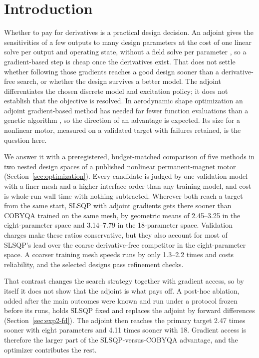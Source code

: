 \documentclass{anvil-paper}
\begin{document}
\section{Introduction}
Whether to pay for derivatives is a practical design decision. An adjoint
gives the sensitivities of a few outputs to many design parameters at the
cost of one linear solve per output and operating state, without a field
solve per parameter \citep{scotzniovsky2025}, so a gradient-based step is
cheap once the derivatives exist. That does not settle whether following those
gradients reaches a good design sooner than a derivative-free search, or
whether the design survives a better model. The adjoint differentiates the
chosen discrete model and excitation policy; it does not establish that the
objective is resolved. In aerodynamic shape optimization an adjoint
gradient-based method has needed far fewer function evaluations than a
genetic algorithm \citep{zingg2008comparative}, so the direction of an
advantage is expected. Its size for a nonlinear motor, measured on a
validated target with failures retained, is the question here.

We answer it with a preregistered, budget-matched comparison of five
methods in two nested design spaces of a published nonlinear
permanent-magnet motor \citep{wiesheu2024spline} (Section~\ref{sec:optimization}).
Every candidate is judged by one validation model with a finer mesh and a
higher interface order than any training model, and cost is whole-run wall
time with nothing subtracted. Wherever both reach a target from the same
start, SLSQP with adjoint gradients gets there sooner than COBYQA trained on
the same mesh, by geometric means of 2.45--3.25 in the eight-parameter
space and 3.14--7.79 in the 18-parameter space. Validation charges make
these ratios conservative, but they also account for most of SLSQP's lead
over the coarse derivative-free competitor in the eight-parameter space. A
coarser training mesh speeds runs by only 1.3--2.2 times and costs
reliability, and the selected designs pass refinement checks.

That contrast changes the search strategy together with gradient access, so
by itself it does not show that the adjoint is what pays off. A post-hoc
ablation, added after the main outcomes were known and run under a
protocol frozen before its runs, holds SLSQP fixed and replaces the adjoint
by forward differences (Section~\ref{sec:exp2-fd}). The adjoint then
reaches the primary target 2.47 times sooner with eight parameters and
4.11 times sooner with 18. Gradient access is therefore the larger part of
the SLSQP-versus-COBYQA advantage, and the optimizer contributes the rest.
\end{document}
